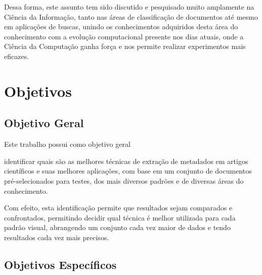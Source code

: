 \begin{textnew}
Dessa forma, este assunto tem sido discutido e pesquisado muito amplamente na Ciência da Informação, tanto nas áreas de classificação de documentos até mesmo em aplicações de buscas, unindo os conhecimentos adquiridos desta área do conhecimento com a evolução computacional presente nos dias atuais, onde a Ciência da Computação ganha força e nos permite realizar experimentos mais eficazes.

\end{textnew}

\section{Objetivos}
\label{sec:goals}


\subsection{Objetivo Geral}
\label{ssec:main-goal}

Este trabalho possui como objetivo geral \begin{textedited}identificar quais são as melhores técnicas de extração de metadados em artigos científicos e suas melhores aplicações, com base em um conjunto de documentos pré-selecionados para testes, dos mais diversos padrões e de diversas áreas do conhecimento.

Com efeito, esta identificação permite que resultados sejam comparados e confrontados, permitindo decidir qual técnica é melhor utilizada para cada padrão visual, abrangendo um conjunto cada vez maior de dados e tendo resultados cada vez mais precisos.

\end{textedited}


\subsection{Objetivos Específicos}
\label{ssec:specific-goals}

